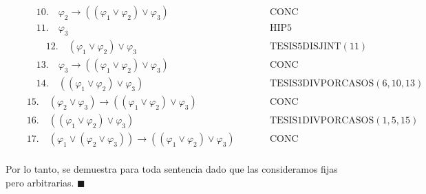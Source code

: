 \documentclass{article}
\begin{document}
\begin{equation*}
\begin{alignedat}{2}
     & \qquad 10. \quad \varphi_2\to((\varphi_1\lor\varphi_2)\lor\varphi_3)                              &  & \qquad\text{CONC}                              \\
     & \qquad 11. \quad \varphi_3                                                                        &  & \qquad\text{HIP}5                              \\
     & \qquad\quad 12. \quad (\varphi_1\lor\varphi_2)\lor\varphi_3                                       &  & \qquad\text{TESIS}5\text{DISJINT}(11)          \\
     & \qquad 13. \quad \varphi_3\to((\varphi_1\lor\varphi_2)\lor\varphi_3)                              &  & \qquad\text{CONC}                              \\
     & \qquad 14. \quad ((\varphi_1\lor\varphi_2)\lor\varphi_3)                                          &  & \qquad\text{TESIS}3\text{DIVPORCASOS}(6,10,13) \\
     & \quad 15. \quad (\varphi_2\lor\varphi_3)\to((\varphi_1\lor\varphi_2)\lor\varphi_3)                &  & \qquad\text{CONC}                              \\
     & \quad 16. \quad ((\varphi_1\lor\varphi_2)\lor\varphi_3)                                           &  & \qquad\text{TESIS}1\text{DIVPORCASOS}(1,5,15)  \\
     & \quad 17. \quad (\varphi_1\lor(\varphi_2\lor\varphi_3))\to((\varphi_1\lor\varphi_2)\lor\varphi_3) &  & \qquad\text{CONC}                              \\
  \end{alignedat}
\end{equation*}

Por lo tanto, se demuestra para toda sentencia dado que las consideramos fijas pero arbitrarias. $\blacksquare$
\end{document}
